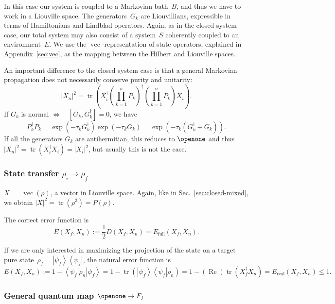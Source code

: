 \documentclass[aps, pra, a4paper, longbibliography]{revtex4}
\newcommand{\I}{\openone}
\newcommand{\be}{\begin{equation}}
\newcommand{\ee}{\end{equation}}
\newcommand{\eq}{\Leftrightarrow}
\newcommand{\ket}[1]{\left| #1 \right \rangle}
\newcommand{\bra}[1]{\left \langle #1 \right|}
\newcommand{\ketbra}[2]{\left| #1 \right \rangle \left \langle #2 \right|}
\DeclareMathOperator{\tr}{tr}
\DeclareMathOperator{\re}{Re}
\DeclareMathOperator{\cvec}{vec}
\begin{document}
In this case our system is coupled to a Markovian bath~$B$, and thus
we have to work in a Liouville space.
The generators~$G_k$ are Liouvillians, expressible in terms of
Hamiltonians and Lindblad operators.
Again, as in the closed system case, our total system may also consist of 
a system~$S$ coherently coupled to an environment~$E$.
We use the $\cvec$-representation of state
operators, explained in Appendix~\ref{sec:vec},
as the mapping between the Hilbert and Liouville spaces.

An important difference to the closed system case is that a general Markovian propagation
does not necessarily conserve purity and unitarity:
\be
|X_n|^2 = \tr\left(X_i^\dagger \left(\prod_{k=1}^{n} P_k\right)^\dagger \left(\prod_{k=1}^{n} P_k\right) X_i\right).
\ee
If $G_k$ is normal $\eq \quad [G_k, G^\dagger_k] = 0$, we have
\be
P_k^\dagger P_k
= \exp(-\tau_k G^\dagger_k) \exp(-\tau_k G_k)
= \exp(-\tau_k (G_k^\dagger + G_k)).
\ee
If all the generators $G_k$ are antihermitian, this reduces to $\I$ and thus
$|X_n|^2 = \tr(X_i^\dagger X_i) = |X_i|^2$, but usually this is not
the case.



\subsubsection{State transfer $\rho_i \to \rho_f$}

$X~=~\cvec(\rho)$, a vector in Liouville space. Again, like in
Sec.~\ref{sec:closed-mixed}, we obtain
$|X|^2 = \tr(\rho^2) = P(\rho)$.

The correct error function is
\be
E(X_f, X_n)
:= \frac{1}{2} D(X_f, X_n)
= E_\text{full}(X_f, X_n).
\ee

If we are only interested in maximizing the projection of
the state on a target pure state~$\rho_f = \ketbra{\psi_f}{\psi_f}$, the natural error
function is
\be
E(X_f, X_n)
:= 1 -\bra{\psi_f} \rho_n \ket{\psi_f}
= 1 -\tr\left(\ketbra{\psi_f}{\psi_f} \rho_n \right)
= 1 -(\re) \tr\left(X_f^\dagger X_n\right)
= E_\text{real}(X_f, X_n) \le 1.
\ee



\subsubsection{General quantum map $\I \to F_f$}
\end{document}

